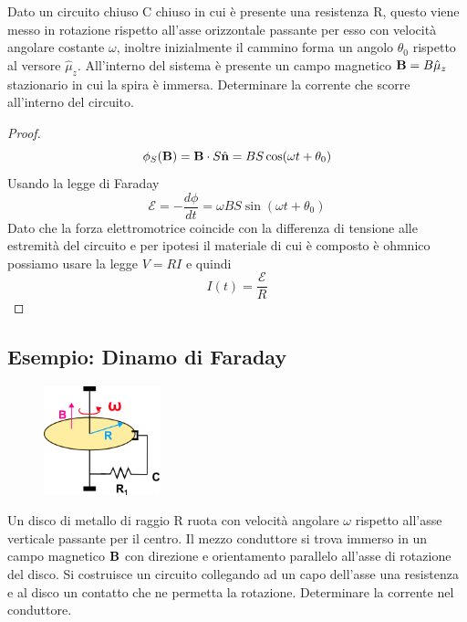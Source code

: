 Dato un circuito chiuso C chiuso in cui \`e presente una resistenza R, questo viene messo in rotazione rispetto all'asse orizzontale passante per esso con velocit\`a angolare costante $\omega$, inoltre inizialmente il cammino forma un angolo $\theta_0$ rispetto al versore $\hat{\mu}_z$. All'interno del sistema \`e presente un campo magnetico $\bold{B} = B \hat{\mu}_z$ stazionario in cui la spira \`e immersa. Determinare la corrente che scorre all'interno del circuito.

\begin{proof}
	\begin{equation*}
		\phi_{S} (\bold{B}) = \bold{B} \cdot S\hat{\bold{n}} = BS\cos(\omega t + \theta_0)
	\end{equation*}
Usando la legge di Faraday
\begin{equation*}
	\mathcal{E} = - \frac{d \phi}{dt} = \omega BS\sin(\omega t+\theta_0) 
\end{equation*}
Dato che la forza elettromotrice coincide con la differenza di tensione alle estremit\`a del circuito e per ipotesi il materiale di cui \`e composto \`e ohmnico possiamo usare la legge $V = RI$ e quindi 
\begin{equation*}
	I(t) = \frac{\mathcal{E}}{R}
\end{equation*}
\end{proof}

\subsection{Esempio: Dinamo di Faraday}

\begin{figure} %
    \centering
    \includegraphics[width=0.30\textwidth]{images/faraday_dinamo.png} %
\end{figure}
Un disco di metallo di raggio R ruota con velocit\`a angolare $\omega$ rispetto all'asse verticale passante per il centro. Il mezzo conduttore si trova immerso in un campo magnetico $\bold{B}$ con direzione e orientamento parallelo all'asse di rotazione del disco. Si costruisce un circuito collegando ad un capo dell'asse una resistenza e al disco un contatto che ne permetta la rotazione. Determinare la corrente nel conduttore.

